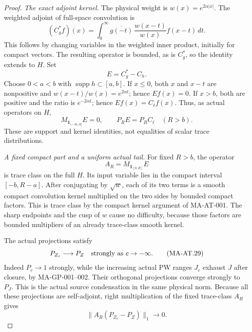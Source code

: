 \begin{proof}
\emph{The exact adjoint kernel.}
The physical weight is \(w(x)=e^{2\alpha|x|}\).
The weighted adjoint of full-space convolution is
\[
 (C_g^*f)(x)
   =\int_0^\infty
       \overline{g(-t)}\,\frac{w(x-t)}{w(x)}f(x-t)\,dt .
 \tag{MA-AT.25}
\]
This follows by changing variables in the weighted inner product,
initially for compact vectors.  The resulting operator is bounded,
as is \(C_g^*\), so the identity extends to \(H\).
Set
\[
                              E=C_g^*-C_h.
 \tag{MA-AT.26}
\]
Choose \(0<a<b\) with \(\operatorname{supp}h\subset[a,b]\).
If \(x\le0\), both \(x\) and \(x-t\) are nonpositive and
\(w(x-t)/w(x)=e^{2\alpha t}\); hence \(Ef(x)=0\).
If \(x>b\), both are positive and the ratio is
\(e^{-2\alpha t}\); hence \(Ef(x)=C_\ell f(x)\).
Thus, as actual operators on \(H\),
\[
 M_{\mathbf1_{(-\infty,0]}}E=0,\qquad
 P_RE=P_RC_\ell\quad(R>b).
 \tag{MA-AT.27}
\]
These are support and kernel identities, not equalities of
scalar trace distributions.

\emph{A fixed compact part and a uniform actual tail.}
For fixed \(R>b\), the operator
\[
                         A_R=M_{\mathbf1_{[0,R]}}E
 \tag{MA-AT.28}
\]
is trace class on the full \(H\).  Its input variable lies in
the compact interval \([-b,R-a]\).
After conjugating by \(\sqrt w\), each of its two terms is a
smooth compact convolution kernel multiplied on the two sides
by bounded compact factors.  This is trace class by the compact
kernel argument of MA-AT-001.  The sharp endpoints and the cusp
of \(w\) cause no difficulty, because those factors are bounded
multipliers of an already trace-class smooth kernel.

The actual projections satisfy
\[
                   P_{Z_c}\longrightarrow P_Z
                   \quad\hbox{strongly as }c\to-\infty.
 \tag{MA-AT.29}
\]
Indeed \(P_c\to1\) strongly, while the increasing actual PW ranges
\(J_c\) exhaust \(J\) after closure, by MA-GP-001--002.
Their orthogonal projections converge strongly to \(P_J\).
This is the actual source condensation in the same physical norm.
Because all these projections are self-adjoint, right
multiplication of the fixed trace-class \(A_R\) gives
\[
             \|A_R(P_{Z_c}-P_Z)\|_1\longrightarrow0.
 \tag{MA-AT.30}
\]


\end{proof}
